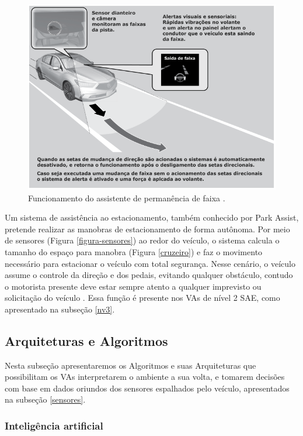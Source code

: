 \begin{figure}[H]
\centering
\includegraphics[width=\textwidth]{Figures/assistente.png}
\caption{Funcionamento do assistente de permanência de faixa \cite{caio}.}
\label{assistente}
\end{figure}

 \label{estacionamento}
Um sistema de assistência ao estacionamento, também conhecido por Park Assist, pretende realizar as manobras de estacionamento de forma autônoma. Por meio de sensores (Figura \ref{figura-sensores}) ao redor do veículo, o sistema calcula o tamanho do espaço para manobra (Figura \ref{cruzeiro}) e faz o movimento necessário para estacionar o veículo com total segurança. Nesse cenário, o veículo assume o controle da direção e dos pedais, evitando qualquer obstáculo, contudo o motorista presente deve estar sempre atento a qualquer imprevisto ou solicitação do veículo \cite{caio}. Essa função é presente nos VAs de nível 2 SAE, como apresentado na subseção \ref{nv3}.
\subsection{Arquiteturas e Algoritmos} \label{arq_alg}

Nesta subseção apresentaremos os Algoritmos e suas Arquiteturas que possibilitam os VAs interpretarem o ambiente a sua volta, e tomarem decisões com base em dados oriundos dos sensores espalhados pelo veículo, apresentados na subseção \ref{sensores}. 


\subsubsection{Inteligência artificial} \label{ia}


